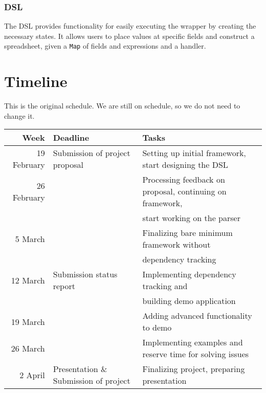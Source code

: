 \documentclass{article}
\begin{document}
\subsubsection{DSL}
	The DSL provides functionality for easily executing the wrapper by creating the necessary states. It allows users to place values at specific fields and construct a spreadsheet, given a \texttt{Map} of fields and expressions and a handler.
	
	\section{Timeline}
	This is the original schedule. We are still on schedule, so we do not need to change it. \\
		\begin{tabular}{|r|l|l|} \hline
			Week & Deadline &Tasks\footnotemark  \\ \hline \hline
			19 February & Submission of project proposal & Setting up initial framework, start designing the DSL\\ \hline
			26 February &  & Processing feedback on proposal, continuing on framework,\\
			 & & start working on the parser \\ \hline
			5 March & & Finalizing bare minimum framework without \\
			 & & dependency tracking \\ \hline
			12 March & Submission status report & Implementing dependency tracking and \\
			 & & building demo application\\ \hline
			19 March & & Adding advanced functionality to demo\\ \hline
			26 March & & Implementing examples and reserve time for solving issues\\ \hline
			2 April & Presentation \& Submission of project & Finalizing project, preparing presentation\\ \hline
			
		\end{tabular}
	\\
	
\end{document}
